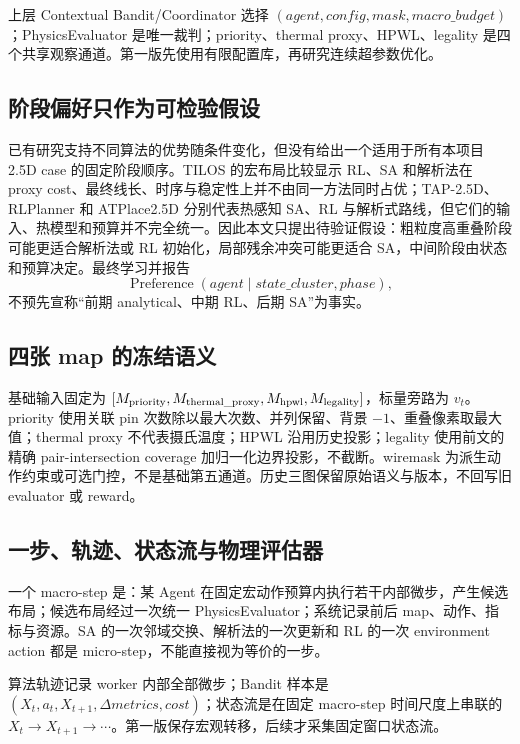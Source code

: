\documentclass[UTF8,a4paper,11pt]{ctexart}
\begin{document}
上层 Contextual Bandit/Coordinator 选择 $(agent, config, mask, macro\_budget)$；PhysicsEvaluator 是唯一裁判；priority、thermal proxy、HPWL、legality 是四个共享观察通道。第一版先使用有限配置库，再研究连续超参数优化。

\subsection{阶段偏好只作为可检验假设}

已有研究支持不同算法的优势随条件变化，但没有给出一个适用于所有本项目 2.5D case 的固定阶段顺序。TILOS 的宏布局比较显示 RL、SA 和解析法在 proxy cost、最终线长、时序与稳定性上并不由同一方法同时占优；TAP-2.5D、RLPlanner 和 ATPlace2.5D 分别代表热感知 SA、RL 与解析式路线，但它们的输入、热模型和预算并不完全统一。因此本文只提出待验证假设：粗粒度高重叠阶段可能更适合解析法或 RL 初始化，局部残余冲突可能更适合 SA，中间阶段由状态和预算决定。最终学习并报告
\[
\operatorname{Preference}(agent\mid state\_cluster, phase),
\]
不预先宣称“前期 analytical、中期 RL、后期 SA”为事实。

\subsection{四张 map 的冻结语义}

基础输入固定为 $[M_{\rm priority},M_{\rm thermal\_proxy},M_{\rm hpwl},M_{\rm legality}]$，标量旁路为 $v_t$。priority 使用关联 pin 次数除以最大次数、并列保留、背景 $-1$、重叠像素取最大值；thermal proxy 不代表摄氏温度；HPWL 沿用历史投影；legality 使用前文的精确 pair-intersection coverage 加归一化边界投影，不截断。wiremask 为派生动作约束或可选门控，不是基础第五通道。历史三图保留原始语义与版本，不回写旧 evaluator 或 reward。

\subsection{一步、轨迹、状态流与物理评估器}

一个 macro-step 是：某 Agent 在固定宏动作预算内执行若干内部微步，产生候选布局；候选布局经过一次统一 PhysicsEvaluator；系统记录前后 map、动作、指标与资源。SA 的一次邻域交换、解析法的一次更新和 RL 的一次 environment action 都是 micro-step，不能直接视为等价的一步。

算法轨迹记录 worker 内部全部微步；Bandit 样本是 $(X_t,a_t,X_{t+1},\Delta metrics,cost)$；状态流是在固定 macro-step 时间尺度上串联的 $X_t\rightarrow X_{t+1}\rightarrow\cdots$。第一版保存宏观转移，后续才采集固定窗口状态流。
\end{document}
